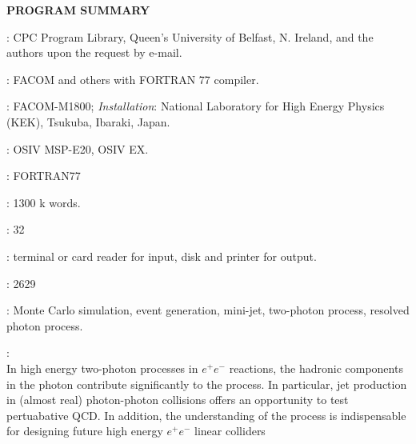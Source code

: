 \vglue 14pt
\centerline{ {\bf PROGRAM SUMMARY}}
\vglue 14pt

{\tenrm
{}
\vglue 12pt

: CPC Program Library,
Queen's University of Belfast, N. Ireland, and the authors
upon the request by e-mail.}

\vglue 12pt

: FACOM and others with FORTRAN 77 compiler.
\vglue 12pt

: FACOM-M1800; {\it Installation}: National
Laboratory for High Energy Physics (KEK), Tsukuba, Ibaraki, Japan.
\vglue 12pt

: OSIV MSP-E20, OSIV EX.
\vglue 12pt

: FORTRAN77
\vglue 12pt

: 1300 k words.
\vglue 12pt

: 32
\vglue 12pt

: terminal or card reader for input, disk
and printer for output.
\vglue 12pt

: 2629
\vglue 12pt

: Monte Carlo simulation, event generation,
mini-jet, two-photon process, resolved photon process.
\vglue 12pt
	
: \\
In high energy two-photon processes in $e^+e^-$ reactions,
the hadronic components in the photon contribute significantly
to the process. In particular, 
jet production in (almost real) photon-photon collisions offers
an opportunity to test pertuabative QCD.
In addition, the understanding of the process
is indispensable for designing future
high energy $e^+e^-$ linear colliders
%


